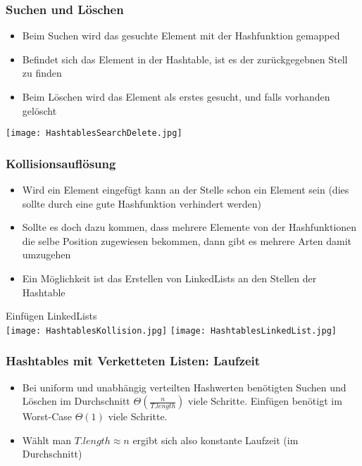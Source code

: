 		\subsubsection{Suchen und Löschen}
			\begin{minipage}{0.6\textwidth}
				\begin{itemize}
					\item Beim Suchen wird das gesuchte Element mit der Hashfunktion gemapped
					\item Befindet sich das Element in der Hashtable, ist es der zurückgegebnen Stell zu finden
					\item Beim Löschen wird das Element als erstes gesucht, und falls vorhanden gelöscht
				\end{itemize}
			\end{minipage}
			\begin{minipage}{0.35\textwidth}
				\begin{center}
					\texttt{[image: HashtablesSearchDelete.jpg]}
				\end{center}
			\end{minipage}
			

		\subsubsection{Kollisionsauflösung}
			\begin{itemize}
				\item Wird ein Element eingefügt kann an der Stelle schon ein Element sein 
					(dies sollte durch eine gute Hashfunktion verhindert werden)
				\item Sollte es doch dazu kommen, dass mehrere Elemente von der Hashfunktionen die
					selbe Position zugewiesen bekommen, dann gibt es mehrere Arten damit umzugehen
				\item Ein Möglichkeit ist das Erstellen von LinkedLists an den Stellen der Hashtable
			\end{itemize}

			\begin{center}
				Einfügen \hspace{8cm} LinkedLists \\
				\texttt{[image: HashtablesKollision.jpg]} \hspace{1cm}
				\texttt{[image: HashtablesLinkedList.jpg]}
			\end{center}


		\subsubsection{Hashtables mit Verketteten Listen: Laufzeit}
			\begin{itemize}
				\item Bei uniform und unabhängig verteilten Hashwerten benötigten Suchen und Löschen
					im Durchschnitt $\Theta(\frac{n}{T.length})$ viele Schritte. Einfügen benötigt
					im Worst-Case $\Theta(1)$ viele Schritte.
				\item Wählt man $T.length \approx n$ ergibt sich also konstante Laufzeit (im Durchschnitt)
			\end{itemize}


